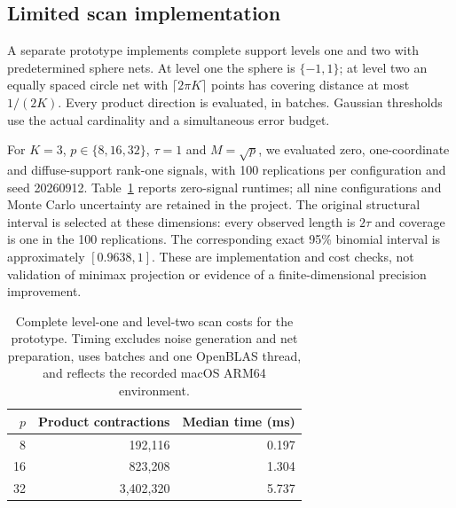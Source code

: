\documentclass[11pt]{article}
\theoremstyle{remark}
\begin{document}
\begin{table}[ht]
\centering

\caption{Noise-assumption stress at $A=0$, $K=3$, $p=n=512$, cap one and nominal level 0.95. Only the first row belongs to the stated iid Gaussian model. These results delimit the calibration; they do not support a robustness claim.}
\label{tab:stress}
\end{table}


\subsection{Limited scan implementation}
A separate prototype implements complete support levels one and two with predetermined sphere nets. At level one the sphere is $\{-1,1\}$; at level two an equally spaced circle net with $\lceil2\pi K\rceil$ points has covering distance at most $1/(2K)$. Every product direction is evaluated, in batches. Gaussian thresholds use the actual cardinality and a simultaneous error budget.

For $K=3$, $p\in\{8,16,32\}$, $\tau=1$ and $M=\sqrt p$, we evaluated zero, one-coordinate and diffuse-support rank-one signals, with 100 replications per configuration and seed 20260912. Table~\ref{tab:scan_runtime} reports zero-signal runtimes; all nine configurations and Monte Carlo uncertainty are retained in the project. The original structural interval is selected at these dimensions: every observed length is $2\tau$ and coverage is one in the 100 replications. The corresponding exact 95\% binomial interval is approximately $[0.9638,1]$. These are implementation and cost checks, not validation of minimax projection or evidence of a finite-dimensional precision improvement.

\begin{table}[ht]
\centering\small
\begin{tabular}{rrr}
\toprule
$p$ & Product contractions & Median time (ms)\\
\midrule
8 & 192,116 & 0.197 \\
16 & 823,208 & 1.304 \\
32 & 3,402,320 & 5.737 \\
\bottomrule
\end{tabular}
\caption{Complete level-one and level-two scan costs for the prototype. Timing excludes noise generation and net preparation, uses batches and one OpenBLAS thread, and reflects the recorded macOS ARM64 environment.}\label{tab:scan_runtime}
\end{table}
\end{document}
